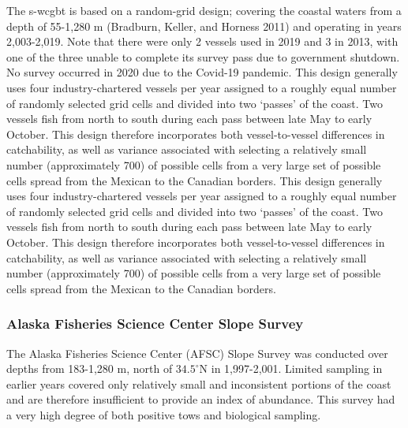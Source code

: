 \documentclass[11pt,
  english,
  a4paper,
]{article}
\begin{document}
The \Gls{s-wcgbt} is based on a random-grid design; covering the coastal waters from a depth of 55-1,280 m {(Bradburn, Keller, and Horness 2011)\leavevmode\tagmcend\tagstructend} and operating in years 2,003-2,019. Note that there were only 2 vessels used in 2019 and 3 in 2013, with one of the three unable to complete its survey pass due to government shutdown. No survey occurred in 2020 due to the Covid-19 pandemic. This design generally uses four industry-chartered vessels per year assigned to a roughly equal number of randomly selected grid cells and divided into two `passes' of the coast. Two vessels fish from north to south during each pass between late May to early October. This design therefore incorporates both vessel-to-vessel differences in catchability, as well as variance associated with selecting a relatively small number (approximately 700) of possible cells from a very large set of possible cells spread from the Mexican to the Canadian borders. This design generally uses four industry-chartered vessels per year assigned to a roughly equal number of randomly selected grid cells and divided into two `passes' of the coast. Two vessels fish from north to south during each pass between late May to early October. This design therefore incorporates both vessel-to-vessel differences in catchability, as well as variance associated with selecting a relatively small number (approximately 700) of possible cells from a very large set of possible cells spread from the Mexican to the Canadian borders.

\leavevmode\tagmcend\tagstructend\par


\hypertarget{alaska-fisheries-science-center-slope-survey}{%
\subsubsection{Alaska Fisheries Science Center Slope Survey}\label{alaska-fisheries-science-center-slope-survey}}

\leavevmode\tagmcend\tagstructend


The Alaska Fisheries Science Center (AFSC) Slope Survey was conducted over depths from 183-1,280 m, north of {\(34.5^\circ\)\leavevmode\tagmcend\tagstructend}N in 1,997-2,001. Limited sampling in earlier years covered only relatively small and inconsistent portions of the coast and are therefore insufficient to provide an index of abundance. This survey had a very high degree of both positive tows and biological sampling.
\end{document}
